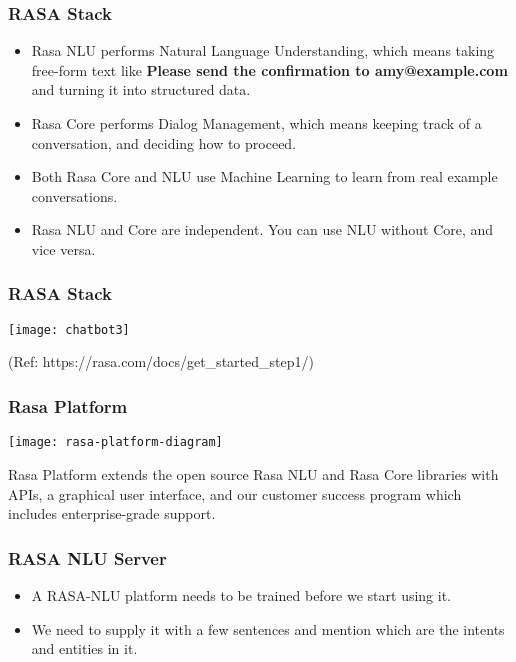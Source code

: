  \begin{frame}[fragile]\frametitle{RASA Stack}
\begin{itemize}
\item Rasa NLU performs Natural Language Understanding, which means taking free-form text like
{\bf Please send the confirmation to amy@example.com}
and turning it into structured data. 
\item Rasa Core performs Dialog Management, which means keeping track of a conversation, and deciding how to proceed. 
\item Both Rasa Core and NLU use Machine Learning to learn from real example conversations.
\item Rasa NLU and Core are independent. You can use NLU without Core, and vice versa.
\end{itemize}
\end{frame}

 \begin{frame}[fragile]\frametitle{RASA Stack}
\begin{center}
\texttt{[image: chatbot3]}
\end{center}

{\tiny (Ref: https://rasa.com/docs/get\_started\_step1/)}

\end{frame}


 \begin{frame}[fragile]\frametitle{Rasa Platform}
\begin{center}
\texttt{[image: rasa-platform-diagram]}
\end{center}
Rasa Platform extends the open source Rasa NLU and Rasa Core libraries with APIs, a graphical user interface, and our customer success program which includes enterprise-grade support.
\end{frame}

 \begin{frame}[fragile]\frametitle{RASA NLU Server}
\begin{itemize}
\item A RASA-NLU platform needs to be trained before we start using it. 
\item We need to supply it with a few sentences and mention which are the intents and entities in it.
\end{itemize}
\end{frame}
